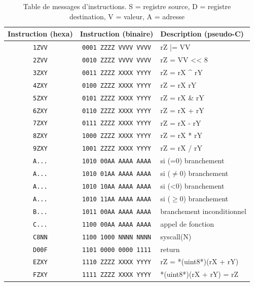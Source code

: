 \documentclass[a4paper,10pt]{article}
\newcommand{\lsl}[1]{\textless{}\textless{} #1} %
\begin{document}
\begin{table}[h]
\begin{center}
\begin{tabular}{|c|c|l|}
  \hline
  Instruction (hexa) & Instruction (binaire) & Description (pseudo-C) \\
  \hline
  \texttt{1ZVV} & \texttt{0001 ZZZZ VVVV VVVV} & rZ |= VV \\
  \texttt{2ZVV} & \texttt{0010 ZZZZ VVVV VVVV} & rZ = VV \lsl 8 \\
  \texttt{3ZXY} & \texttt{0011 ZZZZ XXXX YYYY} & rZ = rX \^{ } rY \\
  \texttt{4ZXY} & \texttt{0100 ZZZZ XXXX YYYY} & rZ = rX \textbar{} rY \\
  \texttt{5ZXY} & \texttt{0101 ZZZZ XXXX YYYY} & rZ = rX \& rY \\
  \texttt{6ZXY} & \texttt{0110 ZZZZ XXXX YYYY} & rZ = rX + rY \\
  \texttt{7ZXY} & \texttt{0111 ZZZZ XXXX YYYY} & rZ = rX - rY \\
  \texttt{8ZXY} & \texttt{1000 ZZZZ XXXX YYYY} & rZ = rX * rY \\
  \texttt{9ZXY} & \texttt{1001 ZZZZ XXXX YYYY} & rZ = rX / rY \\
  \texttt{A...} & \texttt{1010 00AA AAAA AAAA} & si (=0) branchement \\
  \texttt{A...} & \texttt{1010 01AA AAAA AAAA} & si ($\neq$0) branchement \\
  \texttt{A...} & \texttt{1010 10AA AAAA AAAA} & si (<0) branchement \\
  \texttt{A...} & \texttt{1010 11AA AAAA AAAA} & si ($\geq$0) branchement \\
  \texttt{B...} & \texttt{1011 00AA AAAA AAAA} & branchement inconditionnel \\
  \texttt{C...} & \texttt{1100 00AA AAAA AAAA} & appel de fonction \\
  \texttt{C8NN} & \texttt{1100 1000 NNNN NNNN} & syscall(N) \\
  \texttt{D00F} & \texttt{1101 0000 0000 1111} & return \\
  \texttt{EZXY} & \texttt{1110 ZZZZ XXXX YYYY} & rZ = *(uint8*)(rX + rY) \\
  \texttt{FZXY} & \texttt{1111 ZZZZ XXXX YYYY} & *(uint8*)(rX + rY) = rZ \\
  \hline
\end{tabular}
\end{center}
\caption{Table de messages d'instructions. S = registre source, D = registre destination, V = valeur, A = adresse}
\label{fwrisctable}
\end{table}
\end{document}
